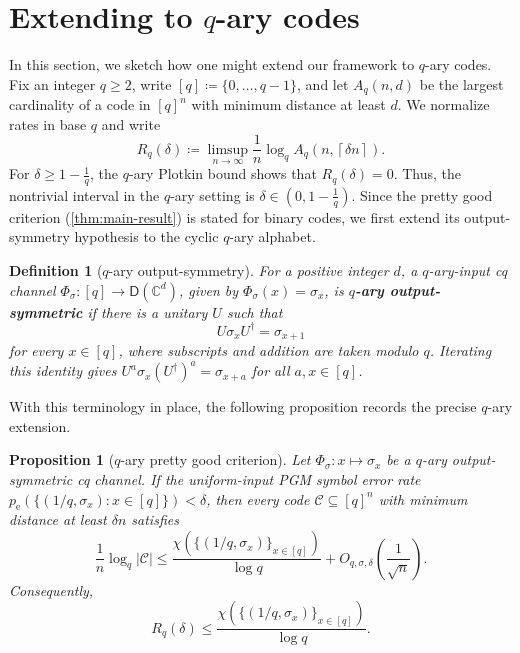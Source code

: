 \documentclass[11pt]{article}
\renewcommand{\leq}{\leqslant}
\renewcommand{\geq}{\geqslant}
\newtheorem{prop}[prop]{Proposition}
\newtheorem{definition}{Definition}[section]
\theoremstyle{remark}
\newcommand{\cC}{\mathcal{C}}
\newcommand{\C}{\mathbb{C}}
\newcommand{\Dens}{\mathsf{D}}
\newcommand{\abs}[1]{\left|#1\right|}
\newcommand{\ceil}[1]{\left\lceil #1 \right\rceil}
\begin{document}
\section{Extending to $q$-ary codes}
\label{sec:qary-codes}

In this section, we sketch how one might extend our framework to $q$-ary codes. Fix an integer $q \geq 2$, write $[q] \coloneqq \{0,\ldots,q-1\}$, and let $A_q(n,d)$ be the largest cardinality of a code in $[q]^n$ with minimum distance at least $d$. We normalize rates in base $q$ and write
\begin{equation*}
R_q(\delta)
\coloneqq
\limsup_{n \to \infty}\frac{1}{n}\log_q{A_q(n,\ceil{\delta n})}.
\end{equation*}
For $\delta \geq 1-\frac{1}{q}$, the $q$-ary Plotkin bound shows that $R_q(\delta) = 0$. Thus, the nontrivial interval in the $q$-ary setting is $\delta \in (0,1-\frac{1}{q})$. Since the pretty good criterion (\cref{thm:main-result}) is stated for binary codes, we first extend its output-symmetry hypothesis to the cyclic $q$-ary alphabet.

\begin{definition}[$q$-ary output-symmetry]
\label{def:qary-output-symmetry}
For a positive integer $d$, a $q$-ary-input cq channel $\Phi_\sigma : [q] \to \Dens(\C^d)$, given by $\Phi_\sigma(x)=\sigma_x$, is \textbf{$q$-ary output-symmetric} if there is a unitary $U$ such that
\begin{equation*}
U\sigma_xU^\dagger=\sigma_{x+1}
\end{equation*}
for every $x \in [q]$, where subscripts and addition are taken modulo $q$. Iterating this identity gives $U^a\sigma_x(U^\dagger)^a=\sigma_{x+a}$ for all $a,x \in [q]$.
\end{definition}

With this terminology in place, the following proposition records the precise $q$-ary extension.

\begin{prop}[$q$-ary pretty good criterion]
\label{prop:qary-main-criterion}
Let $\Phi_\sigma : x \mapsto \sigma_x$ be a $q$-ary output-symmetric cq channel. If the uniform-input PGM symbol error rate $p_{\mathrm{e}}(\{(1/q,\sigma_x) : x \in [q]\}) < \delta$, then every code $\cC \subseteq [q]^n$ with minimum distance at least $\delta n$ satisfies
\begin{equation} \label{eq:qary-main-criterion}
\frac{1}{n}\log_q{\abs{\cC}}
\leq
\frac{\chi(\{(1/q,\sigma_x)\}_{x \in [q]})}{\log q}
+O_{q,\sigma,\delta}\left(\frac{1}{\sqrt{n}}\right).
\end{equation}
Consequently,
\begin{equation*}
R_q(\delta)
\leq
\frac{\chi(\{(1/q,\sigma_x)\}_{x \in [q]})}{\log q}.
\end{equation*}
\end{prop}
\end{document}

